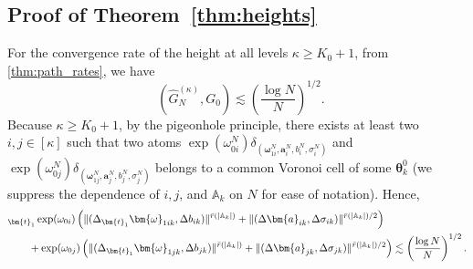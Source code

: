 \documentclass[twoside]{article}
\DeclareMathOperator*{\VDFRA}{D_{FRA}}
\let\inf\relax
\DeclareMathOperator*\inf{\vphantom{p}inf}
\theoremstyle{plain}
\theoremstyle{definition}
\theoremstyle{plain}
\def\vtheta{{\bm{\theta}}}
\def\vomega{{\bm{\omega}}}
\def\va{{\bm{a}}}
\def\vt{{\bm{t}}}
\def\sA{{\mathbb{A}}}
\begin{document}
\subsection{Proof of Theorem~\ref{thm:heights}}
    For the convergence rate of the height at all levels $\kappa \geq K_0 + 1$, from \cref{thm:path_rates}, we have $$\VDFRA (\widehat{G}_N^{(\kappa)}, G_0) \lesssim \left( \frac{\log N}{N} \right)^{1/2}.$$ Because $\kappa \geq K_0 + 1$, by the pigeonhole principle, there exists at least two $i, j \in [\kappa]$ such that two atoms $\exp(\omega_{0i}^{N}) \delta_{(\vomega_{1i}^{N}, \va^N_i, b^N_i, \sigma^N_i)}$ and $\exp(\omega_{0j}^{N}) \delta_{(\vomega_{1j}^{N}, \va^N_j, b^N_j, \sigma^N_j)}$ belongs to a common Voronoi cell of some $\vtheta_k^0$ (we suppress the dependence of $i, j$, and $\sA_k$ on $N$ for ease of notation). Hence, 
    \begin{align*}
        &\inf_{\vt_1}  \exp(\omega_{0i}) \left( \|(\Delta_{\vt_{1}} \vomega_{1 i k},  \Delta b_{i k})\|^{\bar{r}(|\sA_k|)} + \|(\Delta \va_{i k},\Delta \sigma_{i k})\|^{\bar{r}(|\sA_k|)/2} \right)  \\
        &\qquad+  \exp(\omega_{0j}) \left( \|(\Delta_{\vt_{1}} \vomega_{1 j k},  \Delta b_{j k})\|^{\bar{r}(|\sA_k|)} + \|(\Delta \va_{j k},\Delta \sigma_{j k})\|^{\bar{r}(|\sA_k|)/2} \right) \lesssim \left(\frac{\log N}{N} \right)^{1/2}.
    \end{align*}
\end{document}
